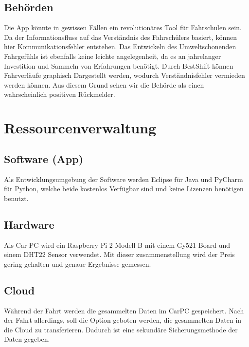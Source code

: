  
 \subsection{Behörden}
 Die App könnte in gewissen Fällen ein revolutionäres Tool für Fahrschulen sein.
 Da der Informationsfluss auf das Verständnis des Fahrschülers basiert, 
 können hier Kommunikationsfehler entstehen. Das Entwickeln des Umweltschonenden Fahrgefühls ist
 ebenfalls keine leichte angelegenheit, da es an jahrelanger Investition und Sammeln von Erfahrungen
 benötigt. Durch BestShift können Fahrverläufe graphisch Dargestellt werden, wodurch Verständnisfehler
 vermieden werden können.
 Aus diesem Grund sehen wir die Behörde als einen wahrscheinlich positiven Rückmelder.
 
 

\section{Ressourcenverwaltung}
 
 \subsection{Software (App)}
 Als Entwicklungsumgebung der Software werden Eclipse für Java und PyCharm für Python,
 welche beide kostenlos Verfügbar sind und keine Lizenzen benötigen benutzt.
 
 \subsection{Hardware}
 Als Car PC wird ein Raspberry Pi 2 Modell B mit einem Gy521 Board und einem DHT22 Sensor verwendet.
 Mit dieser zusammenstellung wird der Preis gering gehalten und genaue Ergebnisse gemessen.
 
 \subsection{Cloud}
 Während der Fahrt werden die gesammelten Daten im CarPC gespeichert.
 Nach der Fahrt allerdings, soll die Option geboten werden, die gesammelten Daten
 in die Cloud zu transferieren. Dadurch ist eine sekundäre Sicherungsmethode der Daten
 gegeben.
